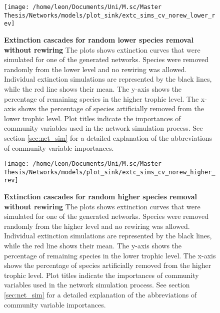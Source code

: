 \documentclass[12pt,a4paper]{article}
\begin{document}
\begin{figure}[H]
	 \centering
	 \texttt{[image: /home/leon/Documents/Uni/M.sc/Master Thesis/Networks/models/plot\_sink/extc\_sims\_cv\_norew\_lower\_rev]}
	 \captionsetup{width = \textwidth}
	 \caption[Extinction cascades for random lower species removal without rewiring]{\textbf{Extinction cascades for random lower species removal without rewiring} The plots shows extinction curves that were simulated for one of the generated networks. Species were removed randomly from the lower level and no rewiring was allowed. Individual extinction simulations are represented by the black lines, while the red line shows their mean. The y-axis shows the percentage of remaining species in the higher trophic level. The x-axis shows the percentage of species artificially removed from the lower trophic level. Plot titles indicate the importances of community variables used in the network simulation process. See section \ref{sec:net_sim} for a detailed explanation of the abbreviations of community variable importances.}
	 \label{fig:extc_cv_norew_lower}
\end{figure}


\begin{figure}[H]
	 \centering
	 \texttt{[image: /home/leon/Documents/Uni/M.sc/Master Thesis/Networks/models/plot\_sink/extc\_sims\_cv\_norew\_higher\_rev]}
	 \captionsetup{width = \textwidth}
	 \caption[Extinction cascades for random higher species removal without rewiring]{\textbf{Extinction cascades for random higher species removal without rewiring} The plots shows extinction curves that were simulated for one of the generated networks. Species were removed randomly from the higher level and no rewiring was allowed. Individual extinction simulations are represented by the black lines, while the red line shows their mean. The y-axis shows the percentage of remaining species in the lower trophic level. The x-axis shows the percentage of species artificially removed from the higher trophic level. Plot titles indicate the importances of community variables used in the network simulation process.  See section \ref{sec:net_sim} for a detailed explanation of the abbreviations of community variable importances.}
	 \label{fig:extc_cv_norew_higher}
\end{figure}
\end{document}

